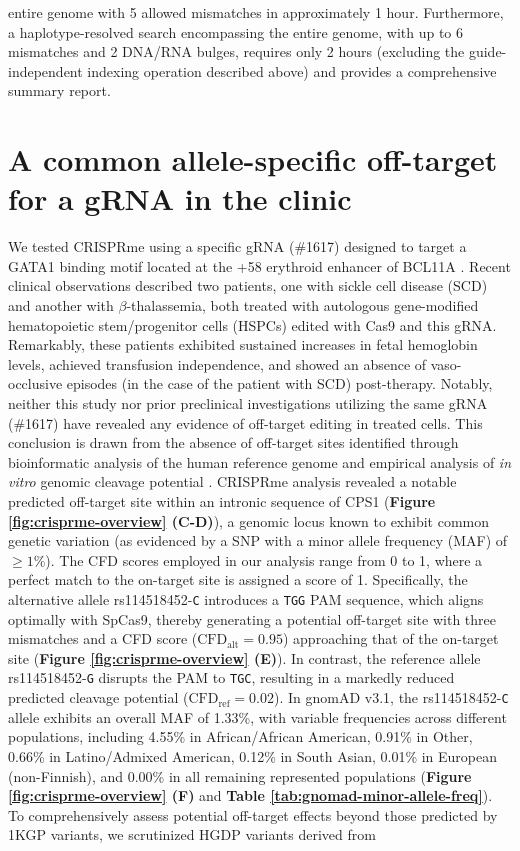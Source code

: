 \documentclass[a4paper, titlepage, openright]{book}
\newcommand{\crisprme}{CRISPRme\xspace}
\begin{document}
entire genome with 5 allowed mismatches in approximately 1 hour. Furthermore, a haplotype-resolved search encompassing the entire genome, with up to 6 mismatches and 2 DNA/RNA bulges, requires only 2 hours (excluding the guide-independent indexing operation described above) and provides a comprehensive summary report.


\section{A common allele-specific off-target for a gRNA in the clinic}\label{section:crisprme-test}
We tested CRISPRme using a specific gRNA (\#1617) designed to target a GATA1 binding motif located at the +58 erythroid enhancer of BCL11A \citep{canver2015bcl11a, wu2019highly}. Recent clinical observations described two patients, one with sickle cell disease (SCD) and another with $\beta$-thalassemia, both treated with autologous gene-modified hematopoietic stem/progenitor cells (HSPCs) edited with Cas9 and this gRNA. Remarkably, these patients exhibited sustained increases in fetal hemoglobin levels, achieved transfusion independence, and showed an absence of vaso-occlusive episodes (in the case of the patient with SCD) post-therapy. Notably, neither this study nor prior preclinical investigations utilizing the same gRNA (\#1617) have revealed any evidence of off-target editing in treated cells. This conclusion is drawn from the absence of off-target sites identified through bioinformatic analysis of the human reference genome and empirical analysis of \emph{in vitro} genomic cleavage potential \citep{frangoul2021crispr, wu2019highly, demirci2019durable}. \crisprme analysis revealed a notable predicted off-target site within an intronic sequence of CPS1 (\textbf{Figure \ref{fig:crisprme-overview} (C-D)}), a genomic locus known to exhibit common genetic variation (as evidenced by a SNP with a minor allele frequency (MAF) of $\geq1$\%). The CFD scores employed in our analysis range from 0 to 1, where a perfect match to the on-target site is assigned a score of 1. Specifically, the alternative allele rs114518452-\texttt{C} introduces a \texttt{TGG} PAM sequence, which aligns optimally with SpCas9, thereby generating a potential off-target site with three mismatches and a CFD score ($\text{CFD}_\text{alt} = 0.95$) approaching that of the on-target site (\textbf{Figure \ref{fig:crisprme-overview} (E)}). In contrast, the reference allele rs114518452-\texttt{G} disrupts the PAM to \texttt{TGC}, resulting in a markedly reduced predicted cleavage potential ($\text{CFD}_\text{ref} = 0.02$). In gnomAD v3.1, the rs114518452-\texttt{C} allele exhibits an overall MAF of 1.33\%, with variable frequencies across different populations, including 4.55\% in African/African American, 0.91\% in Other, 0.66\% in Latino/Admixed American, 0.12\% in South Asian, 0.01\% in European (non-Finnish), and 0.00\% in all remaining represented populations (\textbf{Figure \ref{fig:crisprme-overview} (F)} and \textbf{Table \ref{tab:gnomad-minor-allele-freq}}). To comprehensively assess potential off-target effects beyond those predicted by 1KGP variants, we scrutinized HGDP variants derived from 
\end{document}
